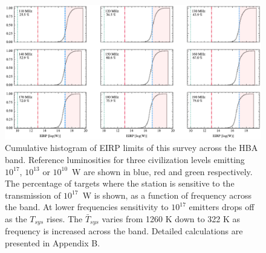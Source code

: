 \begin{figure}
  \centering
     \includegraphics[width = \textwidth]{SETI/figures/EIRP_plots/EIRP_hist_plot.pdf}
      \caption{Cumulative histogram of EIRP limits of this survey across the HBA band. Reference luminosities for three civilization levels emitting $10^{17}$, $10^{13}$ or $10^{10}$~W are shown in blue, red and green respectively. The percentage of targets where the station is sensitive to the transmission of $10^{17}$~W is shown, as a function of frequency across the band. At lower frequencies sensitivity to $10^{17}$ emitters drops off as the $T_{sys}$ rises. The $\bar T_{sys}$ varies from 1260 K down to 322 K as frequency is increased across the band. Detailed calculations are presented in Appendix B.}
  \label{fig:Cumulative_EIRP_plots}
\end{figure}


